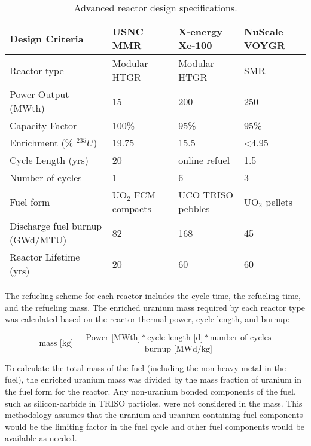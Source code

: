 \begin{table}[ht]
    \centering
    \caption{Advanced reactor design specifications.}
    \label{tab:reactor_summary}
    \renewcommand{\arraystretch}{1.5}
    \begin{tabular}{p{3.5cm}p{3cm}p{3cm}p{3cm}}
        \hline
        Design Criteria & \gls{USNC} \gls{MMR} \cite{noauthor_usnc_2021} & 
        X-energy Xe-100 \cite{mulder_overview_2021} & NuScale VOYGR 
        \cite{nuscale_chapter_2020-1,reyes_nuscale_2021,reyes_correction_2022}\\
        \hline
        Reactor type & Modular HTGR & Modular HTGR & SMR\\
        Power Output (MWth) & 15 & 200  & 250 \\
        Capacity Factor & 100\% & 95\% & 95\% \\
        Enrichment (\% $^{235}U$) & 19.75 & 15.5 & <4.95 \\
        Cycle Length (yrs) & 20 & online refuel & 1.5\\
        Number of cycles & 1 & 6 & 3\\
        Fuel form & UO$_2$ \gls{FCM} compacts & UCO \gls{TRISO} pebbles & UO$_2$ pellets\\
        Discharge fuel burnup (GWd/MTU) & 82 & 168  & 45 \\
        Reactor Lifetime (yrs)& 20 & 60 & 60 \\
        \hline
    \end{tabular}
\end{table}

The refueling scheme for each reactor includes the cycle time, the 
refueling time, and the refueling mass. The enriched uranium mass required by 
each reactor type was calculated based on the reactor thermal power, 
cycle length, and burnup:

\begin{equation}
    \text{mass [kg] = }\frac{\text{Power [MWth]}* \text{cycle 
    length [d]} * \text{number of cycles}}{\text{burnup [MWd/kg]}}
    \label{eq:fuel_mass}
\end{equation}

\noindent To calculate the total mass of the fuel (including the non-heavy 
metal in the fuel), the enriched uranium mass was divided by the mass fraction of 
uranium in the fuel form for the reactor. Any non-uranium bonded components 
of the fuel, such as silicon-carbide in \gls{TRISO} particles, were 
not considered in the mass. This methodology assumes that the 
uranium and uranium-containing fuel components would be the limiting 
factor in the fuel cycle and other fuel components would be available as 
needed. 

